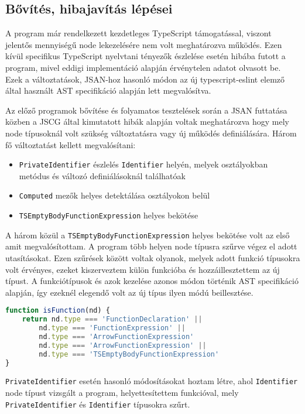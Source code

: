 \subsection{Bővítés, hibajavítás lépései}

A program már rendelkezett kezdetleges TypeScript támogatással, viszont jelentős mennyiségű node lekezelésére nem volt meghatározva működés. Ezen kívül specifikus TypeScript nyelvtani tényezők észlelése esetén hibába futott a program, mivel eddigi implementáció alapján érvénytelen adatot olvasott be. Ezek a változtatások, JSAN-hoz hasonló módon az új typescript-eslint elemző által használt AST specifikáció alapján lett megvalósítva.

Az előző programok bővítése és folyamatos tesztelések során a JSAN futtatása közben a JSCG által kimutatott hibák alapján voltak meghatározva hogy mely node típusoknál volt szükség változtatásra vagy új működés definiálására. Három fő változtatást kellett megvalósítani:

\begin{itemize}
    \item \texttt{PrivateIdentifier} észlelés \texttt{Identifier} helyén, melyek osztályokban metódus és változó definiálásoknál találhatóak
    \item \texttt{Computed} mezők helyes detektálása osztályokon belül
    \item \texttt{TSEmptyBodyFunctionExpression} helyes bekötése
\end{itemize}

A három közül a \texttt{TSEmptyBodyFunctionExpression} helyes bekötése volt az első amit megvalósítottam. A program több helyen node típusra szűrve végez el adott utasításokat. Ezen szűrések között voltak olyanok, melyek adott funkció típusokra volt érvényes, ezeket kiszerveztem külön funkcióba és hozzáillesztettem az új típust. A funkciótípusok és azok kezelése azonos módon történik AST specifikáció alapján, így ezeknél elegendő volt az új típus ilyen módú beillesztése.

\begin{lstlisting}[caption={Funkció típus szűrő},label={lst:jsonconfig}, language={JavaScript}]
function isFunction(nd) {
    return nd.type === 'FunctionDeclaration' ||
        nd.type === 'FunctionExpression' ||
        nd.type === 'ArrowFunctionExpression'
        nd.type === 'ArrowFunctionExpression' ||
        nd.type === 'TSEmptyBodyFunctionExpression'
}
\end{lstlisting}

\texttt{PrivateIdentifier} esetén hasonló módosításokat hoztam létre, ahol \texttt{Identifier} node típust vizsgált a program, helyettesítettem funkcióval, mely \texttt{PrivateIdentifier} és \texttt{Identifier} típusokra szűrt.


